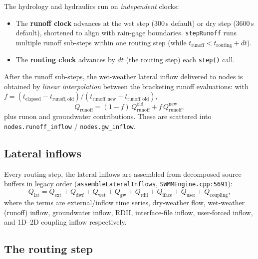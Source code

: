 \documentclass[11pt,a4paper]{article}
\begin{document}
The hydrology and hydraulics run on \emph{independent} clocks:
\begin{itemize}[nosep]
  \item The \textbf{runoff clock} advances at the wet step (300\,s default) or
        dry step (3600\,s default), shortened to align with rain-gage
        boundaries. \texttt{stepRunoff} runs multiple runoff sub-steps within
        one routing step ($\text{while } t_{\mathrm{runoff}} <
        t_{\mathrm{routing}} + dt$).
  \item The \textbf{routing clock} advances by $dt$ (the routing step) each
        \texttt{step()} call.
\end{itemize}
After the runoff sub-steps, the wet-weather lateral inflow delivered to nodes
is obtained by \emph{linear interpolation} between the bracketing runoff
evaluations: with $f = (t_{\mathrm{elapsed}} - t_{\mathrm{runoff,old}}) /
(t_{\mathrm{runoff,new}} - t_{\mathrm{runoff,old}})$,
\begin{equation}
  Q_{\mathrm{runoff}} = (1-f)\,Q_{\mathrm{runoff}}^{\mathrm{old}} +
  f\,Q_{\mathrm{runoff}}^{\mathrm{new}},
\end{equation}
plus runon and groundwater contributions. These are scattered into
\texttt{nodes.runoff\_inflow} / \texttt{nodes.gw\_inflow}.

\subsection{Lateral inflows}

Every routing step, the lateral inflows are assembled from decomposed source
buffers in legacy order (\texttt{assembleLateralInflows},
\texttt{SWMMEngine.cpp:5691}):
\begin{equation}
  Q_{\mathrm{lat}} = Q_{\mathrm{ext}} + Q_{\mathrm{dwf}} +
  Q_{\mathrm{wet}} + Q_{\mathrm{gw}} + Q_{\mathrm{rdii}} +
  Q_{\mathrm{iface}} + Q_{\mathrm{user}} + Q_{\mathrm{coupling}},
\end{equation}
where the terms are external/inflow time series, dry-weather flow,
wet-weather (runoff) inflow, groundwater inflow, RDII, interface-file
inflow, user-forced inflow, and 1D--2D coupling inflow respectively.

\subsection{The routing step}
\end{document}
